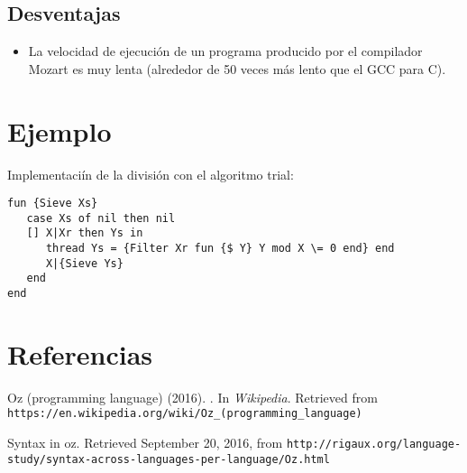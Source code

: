 \documentclass{IEEEtran}
\begin{document}
\subsection{Desventajas}
\begin{itemize}
\item La velocidad de ejecuci\'on de un programa producido por el compilador Mozart es muy lenta (alrededor de 50 veces m\'as lento que el GCC para C).

\end{itemize}
\section{Ejemplo}
Implementaci\'in de la divisi\'on con el algoritmo trial:
\begin{lstlisting}
fun {Sieve Xs}
   case Xs of nil then nil
   [] X|Xr then Ys in
      thread Ys = {Filter Xr fun {$ Y} Y mod X \= 0 end} end
      X|{Sieve Ys}
   end
end
\end{lstlisting}

\section{Referencias}

\begin{thebibliography}{99}

 Oz (programming language) (2016). . In \emph{Wikipedia}. Retrieved from  \texttt{https://en.wikipedia.org/wiki/Oz\_(programming\_language)}

 Syntax in oz. Retrieved September 20, 2016, from \texttt{http://rigaux.org/language-study/syntax-across-languages-per-language/Oz.html}


\end{thebibliography}
\end{document}
